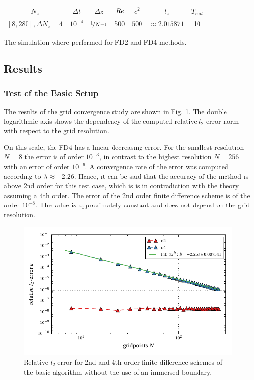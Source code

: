\begin{center}
\vspace*{0.7ex}
\begin{tabular}{c|c|c|c|c|c|c }
 $ N_z  $                       &  $\Delta t$ & $\Delta z$            & $\mbox{\textit{Re}}$  & $c^2$   & $l_z$ & $T_{end}$\\
\hline
 $[8, 280], \Delta N_z = 4 $ &  $10^{-4}$ & $\nicefrac{1}{N - 1}$ & 500     & $500$   & $\approx{2.015871}$  & 10\\
\end{tabular}
\vspace*{0.7ex}
\end{center}

The simulation where performed for FD2 and FD4 methods.

\clearpage

\subsection{Results}
\subsubsection{Test of the Basic Setup}

The results of the grid convergence study are shown in Fig. \ref{fig:ema1}.
The double logarithmic axis shows the dependency of the computed relative $l_2$-error norm
with respect to the grid resolution.

On this scale, the FD4 has a linear decreasing error.
For the smallest resolution $N=8$ the error is of order $10^{-3}$,
in contrast to the highest resolution $N=256$ with an error of order $10^{-6}$.
A convergence rate of the error  was computed  according to $\lambda\approx -2.26$.
Hence, it can be said that the accuracy of the method is above 2nd order for this test case,
which is is in contradiction with the theory assuming a 4th order.
The error of the 2nd order finite difference scheme is of the order $10^{-8}$.
The value is approximately constant and does not depend on the grid resolution.

\begin{figure}[!bp]
    \centering
    \includegraphics{gfx/immersed_boundary/poiseuille_flow/1_default/relative_l2error.pdf}
    \caption{Relative $l_2$-error for 2nd and 4th order finite difference schemes of the basic algorithm without the use of an immersed boundary.\label{fig:ema1}}
\end{figure}


